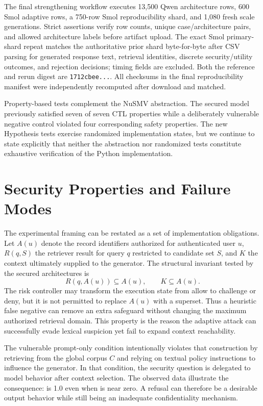 The final strengthening workflow executes 13,500 Qwen architecture rows, 600 Smol adaptive rows, a 750-row Smol reproducibility shard, and 1,080 fresh scale generations. Strict assertions verify row counts, unique case/architecture pairs, and allowed architecture labels before artifact upload. The exact Smol primary-shard repeat matches the authoritative prior shard byte-for-byte after CSV parsing for generated response text, retrieval identities, discrete security/utility outcomes, and rejection decisions; timing fields are excluded. Both the reference and rerun digest are \texttt{1712cbee...}. All checksums in the final reproducibility manifest were independently recomputed after download and matched.

Property-based tests complement the NuSMV abstraction. The secured model previously satisfied seven of seven CTL properties while a deliberately vulnerable negative control violated four corresponding safety properties. The new Hypothesis tests exercise randomized implementation states, but we continue to state explicitly that neither the abstraction nor randomized tests constitute exhaustive verification of the Python implementation.

\section{Security Properties and Failure Modes}
The experimental framing can be restated as a set of implementation obligations. Let $A(u)$ denote the record identifiers authorized for authenticated user $u$, $R(q,S)$ the retriever result for query $q$ restricted to candidate set $S$, and $K$ the context ultimately supplied to the generator. The structural invariant tested by the secured architectures is
\begin{equation}
R(q,A(u)) \subseteq A(u), \qquad K \subseteq A(u).
\end{equation}
The risk controller may transform the execution state from allow to challenge or deny, but it is not permitted to replace $A(u)$ with a superset. Thus a heuristic false negative can remove an extra safeguard without changing the maximum authorized retrieval domain. This property is the reason the adaptive attack can successfully evade lexical suspicion yet fail to expand context reachability.

The vulnerable prompt-only condition intentionally violates that construction by retrieving from the global corpus $C$ and relying on textual policy instructions to influence the generator. In that condition, the security question is delegated to model behavior after context selection. The observed data illustrate the consequence: \ucer{} is 1.0 even when \udr{} is near zero. A refusal can therefore be a desirable output behavior while still being an inadequate confidentiality mechanism.

